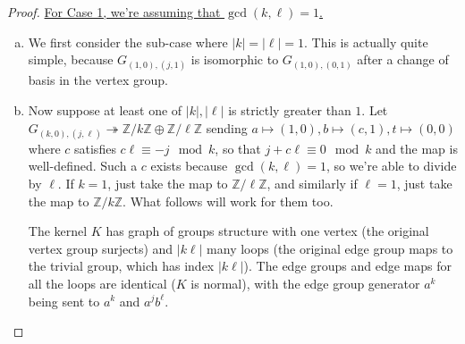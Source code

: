 \documentclass[10pt]{article}
\def\integers{{\mathbb{Z}}}
\theoremstyle{definition}
\begin{document}
\begin{proof} \underline{For Case 1, we're assuming that $\gcd(k,\ell)=1$.}

\begin{enumerate}[(a)]
    \item We first consider the sub-case where $|k|=|\ell|=1$. This is actually quite simple, because $G_{(1,0),(j,1)}$ is isomorphic to $G_{(1,0),(0,1)}$ after a change of basis in the vertex group. 

\begin{center}
 \end{center}

\item Now suppose at least one of $|k|,|\ell|$ is strictly greater than $1$. Let $G_{(k,0),(j,\ell)} \twoheadrightarrow \integers/k\integers \oplus \integers/\ell\integers$ sending $a \mapsto (1,0), b \mapsto (c,1), t \mapsto (0,0)$ where $c$ satisfies $c\ell \equiv -j \mod k$, so that $j+c\ell \equiv 0 \mod k$ and the map is well-defined. Such a $c$ exists because $\gcd(k,\ell)=1$, so we're able to divide by $\ell$. If $k=1$, just take the map to $\integers/\ell \integers$, and similarly if $\ell=1$, just take the map to $\integers/k\integers$. What follows will work for them too. 

The kernel $K$ has graph of groups structure with one vertex (the original vertex group surjects) and $|k\ell|$ many loops (the original edge group maps to the trivial group, which has index $|k\ell|$). The edge groups and edge maps for all the loops are identical ($K$ is normal), with the edge group generator $a^k$ being sent to $a^k$ and $a^j b^\ell$. 




\end{enumerate}
\end{proof}
\end{document}

